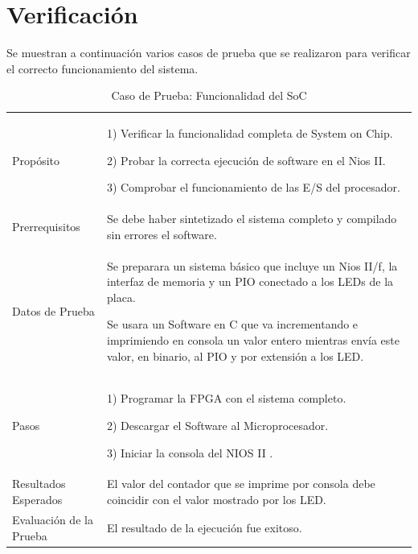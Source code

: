 \section{Verificación}
Se muestran a continuación varios casos de prueba que se realizaron para verificar el correcto funcionamiento del sistema.
\begin{table}
	\begin{tabular}{|>{\columncolor[gray]{0.8}}l|p{9cm}|} \hline
\multicolumn{2}{|>{\columncolor[gray]{0.8}}l|}{\textbf{Caso de Prueba: Funcionalidad del SoC}}\\ \hline
Propósito  & 1) Verificar la funcionalidad completa de System on Chip. 

2) Probar la correcta ejecución de software en el Nios II.

3) Comprobar el funcionamiento de las E/S del procesador. 
\\ \hline
 Prerrequisitos  & Se debe haber sintetizado el sistema completo y compilado sin errores el software.\\ \hline
 Datos de Prueba & Se preparara un sistema básico que incluye un Nios II/f, la interfaz de memoria y un PIO conectado a los LEDs de la placa.

Se usara un Software en C que va incrementando e imprimiendo en consola un valor entero mientras envía este valor, en binario, al PIO y por extensión a los LED.  \\ \hline
 Pasos & 1) Programar la FPGA con el sistema completo.

2) Descargar el Software al Microprocesador.

3) Iniciar la consola del NIOS II .\\ \hline
 Resultados Esperados & El valor del contador que se imprime por consola debe coincidir con el valor mostrado por los LED.\\ \hline
 Evaluación de la Prueba  & El resultado de la ejecución fue exitoso. \\ \hline
	\end{tabular}
	\caption{Caso de Prueba: Funcionalidad del SoC}
	\label{tab:testsoc}
\end{table}
